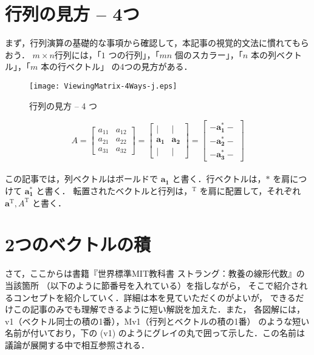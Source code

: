 \documentclass[letterpaper]{article}
\DeclareRobustCommand\transp{^{\mathrm{T}}}
\begin{document}
\tableofcontents

\section{行列の見方 -- 4つ}

まず，行列演算の基礎的な事項から確認して，本記事の視覚的文法に慣れてもらおう．
$m \times n$行列には，「$1$ つの行列」，「$mn$ 個のスカラー」，「$n$ 本の列ベクトル」，「$m$ 本の行ベクトル」
の4つの見方がある．

\begin{figure}[H]
  \centering
  \texttt{[image: ViewingMatrix-4Ways-j.eps]}\\
    \caption{行列の見方 -- 4 つ}
\end{figure}


\begin{equation*}
  A= \begin{bmatrix}
    a_{11} & a_{12}\\
    a_{21} & a_{22}\\
    a_{31} & a_{32}
  \end{bmatrix}
  =
  \begin{bmatrix}
    | & |\\
    \bm{a_1} & \bm{a_2}\\
    | & |
  \end{bmatrix}
  =
  \begin{bmatrix}
    - \bm{a_1^*} -\\
    - \bm{a_2^*} -\\
    - \bm{a_3^*} -
  \end{bmatrix}
\end{equation*} \\

この記事では，列ベクトルはボールドで $\bm{a_1}$ と書く．行ベクトルは，$\bm{*}$ を肩につけて $\bm{a_1^*}$ と書く．
転置されたベクトルと行列は，$\transp$ を肩に配置して，それぞれ $\bm{a}\transp, A\transp$ と書く．

\section{2つのベクトルの積}

さて，ここからは書籍『世界標準MIT教科書 ストラング：教養の線形代数』の当該箇所
（以下のように節番号を入れている）を指しながら，
そこで紹介されるコンセプトを紹介していく．詳細は本を見ていただくのがよいが，
できるだけこの記事のみでも理解できるように短い解説を加えた．また，
各図解には，v1（ベクトル同士の積の1番），Mv1（行列とベクトルの積の1番）
のような短い名前が付いており，下の (v1) のようにグレイの丸で囲って示した．この名前は議論が展開する中で相互参照される．
\end{document}
